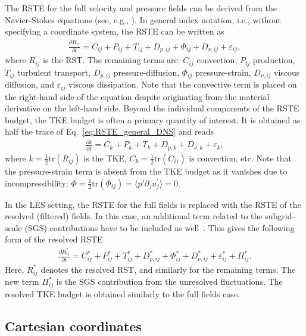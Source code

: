 The RSTE for the full velocity and pressure fields can be derived from the Navier-Stokes equations (see, e.g., \cite{pope2000turbulent}).
In general index notation, i.e., without specifying a coordinate system, the RSTE can be written as
\begin{align}
\label{eq:RSTE_general_DNS}
    \frac{\partial R_{ij}}{\partial t}
    =
    C_{ij} + P_{ij} + T_{ij} + D_{p,ij} + \Phi_{ij} + D_{\nu,ij} + \varepsilon_{ij},
\end{align}
where $R_{ij}$ is the RST.
The remaining terms are: $C_{ij}$ convection, $P_{ij}$ production, $T_{ij}$ turbulent transport, $D_{p,ij}$ pressure-diffusion, $\Phi_{ij}$ pressure-strain, $D_{\nu,ij}$ viscous diffusion, and $\varepsilon_{ij}$ viscous dissipation.
Note that the convective term is placed on the right-hand side of the equation despite originating from the material derivative on the left-hand side.
Beyond the individual components of the RSTE budget, the TKE budget is often a primary quantity of interest.
It is obtained as half the trace of Eq.~\eqref{eq:RSTE_general_DNS} and reads
\begin{align}
    \frac{\partial k}{\partial t}
    =
    C_k + P_k + T_k + D_{p,k} + D_{\nu,k} + \varepsilon_k ,
\end{align}
where $k = \tfrac{1}{2} \text{tr}(R_{ij})$ is the TKE, $C_k = \tfrac{1}{2} \text{tr}(C_{ij})$ is convection, etc.
Note that the pressure-strain term is absent from the TKE budget as it vanishes due to incompressibility; $\Phi = \tfrac{1}{2} \text{tr}(\Phi_{ij}) = \langle p' \partial_j u^{\prime}_j \rangle = 0$.

In the LES setting, the RSTE for the full fields is replaced with the RSTE of the resolved (filtered) fields.
In this case, an additional term related to the subgrid-scale (SGS) contributions have to be included as well~\cite{meneveau1994statistics}.
This gives the following form of the resolved RSTE
\begin{align}
\label{eq:RSTE_general_LES}
    \frac{\partial R_{ij}^*}{\partial t}
    =
    C_{ij}^* + P_{ij}^* + T_{ij}^* + D_{p,ij}^* + \Phi_{ij}^* + D_{\nu,ij}^* + \varepsilon_{ij}^* + \Pi_{ij}^*.
\end{align}
Here, $R_{ij}^*$ denotes the resolved RST, and similarly for the remaining terms.
The new term $\Pi_{ij}^*$ is the SGS contribution from the unresolved fluctuations.
The resolved TKE budget is obtained similarly to the full fields case.

\subsection{Cartesian coordinates}
\label{subsec:cartesian_coordinates}

